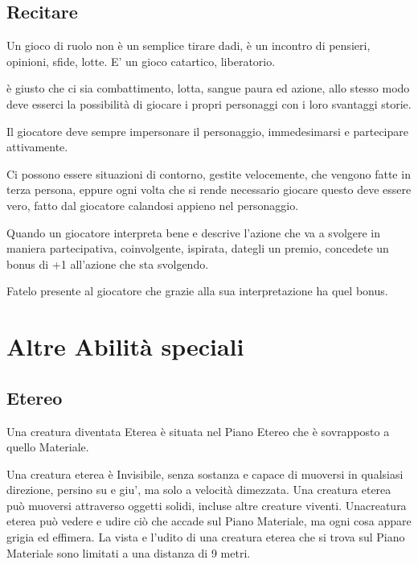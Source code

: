 \documentclass[a4paper,11pt,twoside,openany]{book}
\begin{document}
\subsection{Recitare}

\label{recitare}

Un gioco di ruolo non è un semplice tirare dadi, è un incontro di pensieri, opinioni, sfide, lotte. E' un gioco catartico, liberatorio.

è giusto che ci sia combattimento, lotta, sangue paura ed azione, allo stesso modo deve esserci la possibilità di giocare i propri personaggi con i loro svantaggi storie.

Il giocatore deve sempre impersonare il personaggio, immedesimarsi e partecipare attivamente.

Ci possono essere situazioni di contorno, gestite velocemente, che vengono fatte in terza persona, eppure ogni volta che si rende necessario giocare questo deve essere vero, fatto dal giocatore calandosi appieno nel personaggio.

Quando un giocatore interpreta bene e descrive l'azione che va a svolgere in maniera partecipativa, coinvolgente, ispirata, dategli un premio, concedete un bonus di +1 all'azione che sta svolgendo.

Fatelo presente al giocatore che grazie alla sua interpretazione ha quel bonus.

\pagebreak

\section{Altre Abilità speciali}

\label{altre-abilita-speciali}

\subsection{Etereo}

\label{etereo}

Una creatura diventata Eterea è situata nel Piano Etereo che è sovrapposto a quello Materiale.

Una creatura eterea è Invisibile, senza sostanza e capace di muoversi in qualsiasi direzione, persino su e giu', ma solo a velocità dimezzata. Una creatura eterea può muoversi attraverso oggetti solidi, incluse altre creature viventi. Unacreatura eterea può vedere e udire ciò che accade sul Piano Materiale, ma ogni cosa appare grigia ed effimera. La vista e l'udito di una creatura eterea che si trova sul Piano Materiale sono limitati a una distanza di 9 metri.
\end{document}
